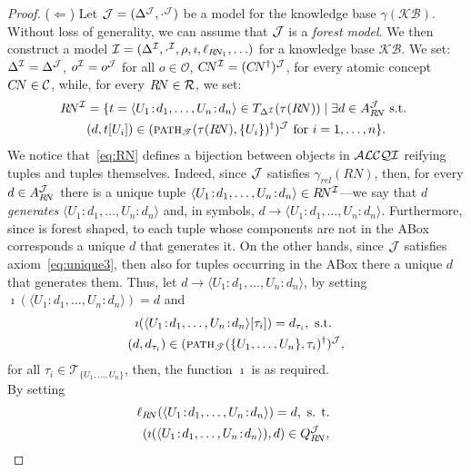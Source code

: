 \documentclass[envcountsame,draft]{llncs}
\newcommand{\KB}{\ensuremath{\mathcal{KB}}\xspace}
\newcommand{\pth}[2]{\ensuremath{\textsc{path}_{\mathscr{T}}(#1,#2)}\xspace}
\newcommand{\Ob}{\ensuremath{\mathcal{O}}\xspace}
\begin{document}
\begin{proof}
($\Leftarrow$) Let $\mathcal{J}=(\Delta^\mathcal{J},\cdot^\mathcal{J})$ be a model for the
knowledge base $\gamma(\KB)$.  Without loss of generality, we can
assume that $\mathcal{J}$ is a \textit{forest model}. We then construct a model
$\mathcal{I} = (\Delta^\mathcal{I}, \cdot^\mathcal{I}, \rho, \imath, \ell_{R\!N_1},\ldots)$
for a \DLRpm knowledge base $\KB$. We set:
$\Delta^\mathcal{I} = \Delta^\mathcal{J}$, $o^\mathcal{I} = o^\mathcal{J}$ for all $o\in\Ob$, $C\!N^\mathcal{I} = (C\!N^\dag)^\mathcal{J}$, for every
atomic concept $C\!N\in\mathcal{C}$, while, for every ${R\!N}\in\mathcal{R}$, we set:
%
\begin{multline}\label{eq:RN}
  R\!N^\Imc = \{t=\langle U_1\!:\!d_1,\ldots,U_n\!:\!d_n\rangle \in T_{\Delta^\Imc}(\tau(R\!N))\mid
  \exists d\in A_{R\!N}^\Jmc \text{ s.t. }\\ (d,t[U_i])\in (\pth{\tau(R\!N)}{\{U_i\}}^\dag)^\Jmc \text{ for } i=1,\ldots,n\}.
\end{multline}
%
We notice that~\eqref{eq:RN} defines a bijection between objects in
${\cal ALCQI}$ reifying tuples and tuples themselves. Indeed, since $\mathcal{J}$
satisfies $\gamma_{\textit{rel}}(R\!N)$, then, for every
$d\in A_{R\!N}^\mathcal{J}$ there is a unique tuple
$\langle U_1\!:\!d_1,\ldots,U_n\!:\!d_n\rangle \in R\!N^\mathcal{I}$---we say
that $d$ \emph{generates}
$\langle U_1\!:\!d_1,\ldots,U_n\!:\!d_n\rangle$ and, in symbols,
$d\to \langle U_1\!:\!d_1,\ldots,U_n\!:\!d_n\rangle$. Furthermore,
since \Jmc is forest shaped, to each tuple whose components are not in
the ABox corresponds a unique $d$ that generates it. On the other
hands, since $\mathcal{J}$ satisfies axiom~\eqref{eq:unique3}, then also for
tuples occurring in the ABox there a unique $d$ that generates them.
Thus, let $d\to \langle U_1\!:\!d_1,\ldots,U_n\!:\!d_n\rangle$, by
setting $\imath(\langle U_1\!:\!d_1,\ldots,U_n\!:\!d_n\rangle) = d$
and
%
\begin{multline}\label{eq:iota}
  \imath(\langle U_1\!:\!d_1,\ldots,U_n\!:\!d_n\rangle[\tau_i])=d_{\tau_i}, \text{ s.t. }\\
  (d,d_{\tau_i})\in(\pth{\{U_1,\ldots,U_n\}}{\tau_i}^\dag)^\Jmc,
\end{multline}
%
for all ${\tau_i\in\mathscr{T}_{\{U_1,\ldots,U_n\}}}$, then, the function $\imath$ is as required.\\
%
By setting
\begin{multline}\label{eq:lobj}
  \ell_{R\!N}(\langle U_1\!:\!d_1,\ldots,U_n\!:\!d_n\rangle) =
  d, \text{ s. t. }\\
  (\imath(\langle U_1\!:\!d_1,\ldots,U_n\!:\!d_n\rangle),d)\in
  Q_{R\!N}^\Jmc,
\end{multline}

\end{proof}
\end{document}
